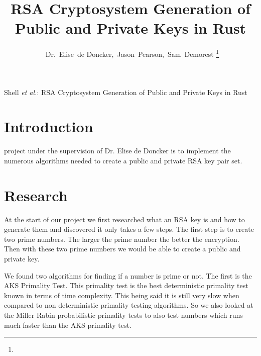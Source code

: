 \documentclass[12pt,technote]{IEEEtran}
\begin{document}
\lstset{language=bash}
%
\title{RSA Cryptosystem Generation of Public and Private Keys in Rust}
\author{~Dr.~Elise~de Doncker,~Jason~Pearson,~Sam~Demorest%
\thanks{}}

\markboth{}%
{Shell \MakeLowercase{\textit{et al.}}: RSA Cryptosystem Generation of Public 
and Private Keys in Rust}





\maketitle

\IEEEdisplaynotcompsoctitleabstractindextext
\IEEEpeerreviewmaketitle



\section{Introduction}
 project under the supervision of Dr. Elise de Doncker is to implement the numerous algorithms needed to create a public and private RSA key pair set. 


\section{Research}
At the start of our project we first researched what an RSA key is and how to 
generate them and discovered it only takes a few steps. The first step is to 
create two prime numbers. The larger the prime number the better the encryption. 
Then with these two prime numbers we would be able to create a public and 
private key. 

\newline \indent We found two algorithms for finding if a number is prime or 
not. The first is the AKS Primality Test. This primality test is the best 
deterministic primality test known in terms of time complexity. This being said 
it is still very slow when compared to non deterministic primality testing 
algorithms. So we also looked at the Miller Rabin probabilistic primality tests 
to also test numbers which runs much faster than the AKS primality test.
\end{document}

